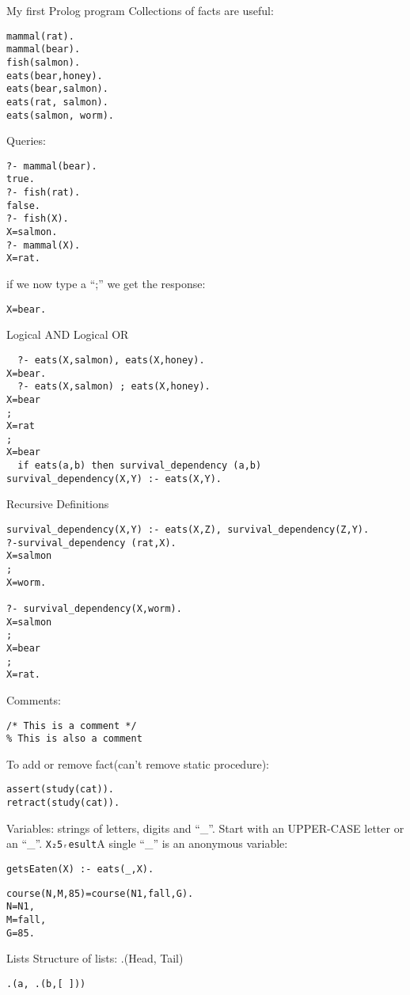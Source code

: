         My first Prolog program
        Collections of facts are useful:
\begin{verbatim}
mammal(rat).
mammal(bear).
fish(salmon).
eats(bear,honey).
eats(bear,salmon).
eats(rat, salmon).
eats(salmon, worm).
\end{verbatim}

        Queries:
\begin{verbatim}
?- mammal(bear).
true.
?- fish(rat).
false.
?- fish(X).
X=salmon.
?- mammal(X).
X=rat.
\end{verbatim}
        if we now type a “;” we get the response:
\begin{verbatim}
X=bear.
\end{verbatim}

        Logical AND
        Logical OR
\begin{verbatim}
  ?- eats(X,salmon), eats(X,honey).
X=bear.
  ?- eats(X,salmon) ; eats(X,honey).
X=bear
;
X=rat
;
X=bear
  if eats(a,b) then survival_dependency (a,b)
survival_dependency(X,Y) :- eats(X,Y).
\end{verbatim}

        Recursive Definitions
\begin{verbatim}
survival_dependency(X,Y) :- eats(X,Z), survival_dependency(Z,Y).
?-survival_dependency (rat,X).
X=salmon
;
X=worm.

?- survival_dependency(X,worm).
X=salmon
;
X=bear
;
X=rat.

\end{verbatim}
        Comments:
\begin{verbatim}
/* This is a comment */
% This is also a comment
\end{verbatim}

        To add or remove fact(can’t remove static procedure):
\begin{verbatim}
assert(study(cat)).
retract(study(cat)).
\end{verbatim}

Variables: strings of letters, digits and “\_”. Start with an UPPER-CASE letter or an “\_”.
\verb+X₂5ᵣesult+A single “\_” is an anonymous variable:
\begin{verbatim}
getsEaten(X) :- eats(_,X).
\end{verbatim}

\begin{verbatim}
course(N,M,85)=course(N1,fall,G).
N=N1,
M=fall,
G=85.
\end{verbatim}

        Lists
        Structure of lists: .(Head, Tail)
\begin{verbatim}
.(a, .(b,[ ]))
\end{verbatim}

